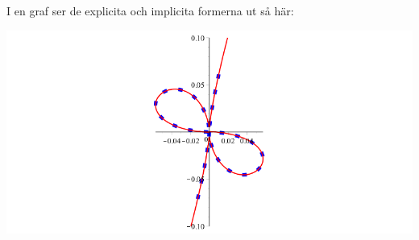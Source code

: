 I en graf ser de explicita och implicita formerna ut så här:

\begin{center}
\includegraphics[scale=0.35]{Export/implicitplot6.png}
\end{center}
